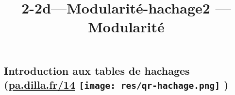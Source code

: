 \documentclass[a4paper,17pt]{extarticle}
\title{2-2d---Modularité-hachage}
\begin{document}
    
    \title{2 --- Modularité}

    
    

    
    \hypertarget{introduction-aux-tables-de-hachages-pa.dilla.fr14}{%
\subsection[Introduction aux tables de hachages
(\href{https://pa.dilla.fr/14}{pa.dilla.fr/14}
)]{\texorpdfstring{Introduction aux tables de hachages
(\href{https://pa.dilla.fr/14}{pa.dilla.fr/14}
\protect\texttt{[image: res/qr-hachage.png]}
)}{Introduction aux tables de hachages (pa.dilla.fr/14  )}}\label{introduction-aux-tables-de-hachages-pa.dilla.fr14}}
\end{document}
